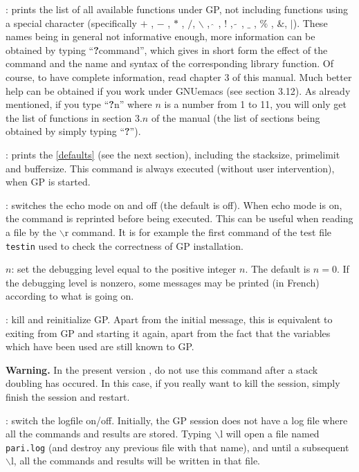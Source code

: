: prints the list of all available functions
under GP, not including functions using a special character (specifically
$+$ , $-$ , $*$ , $/$, $\backslash$ , $\hat{\ }$ , $!$ , $\tilde{\ }$ ,
$\_$ , $\%$ , $\&$, $|$). These names being in general not
informative enough, more information can be obtained by typing
``{\bf ?}command'', which gives in short form the effect of the command
and the name and syntax of the corresponding library function.
Of course, to have complete information, read chapter 3 of this
manual. Much better help can be obtained if you work under GNUemacs
(see section 3.12). As already mentioned, if you type ``{\bf ?}n''
where $n$ is a number from 1 to 11, you will only get the list of
functions in section $3.n$ of the manual (the list of sections
being obtained by simply typing ``{\bf ?}'').

: prints the \ref{defaults} (see the next
section), including the stacksize, primelimit and buffersize. This
command is always executed (without user intervention), when GP is started.

: switches the echo mode on and off (the default
is off). When echo mode is on, the command is reprinted before being executed.
This can be useful when reading a file by the $\backslash$r command. It is
for example the first command of the test file {\tt testin} used to check
the correctness of GP installation.

$n$: set the debugging level equal to the positive
integer $n$. The default is $n=0$. If the debugging level is nonzero, some
messages may be printed (in French) according to what is going on. 

: kill and reinitialize GP. Apart from the
initial message, this is equivalent to exiting from GP and starting it again,
apart from the fact that the variables which have been used are still known
to GP. 

{\bf Warning.} In the present version \vers, do not use this command
after a stack doubling has occured. In this case, if you really want to kill
the session, simply finish the session and restart.

: switch the logfile on/off. Initially, the GP
session does not have a log file where all the commands and results are stored.
Typing $\backslash$l will open a file named {\tt pari.log} (and destroy any
previous file with that name), and until a subsequent $\backslash$l, all the
commands and results will be written in that file.


